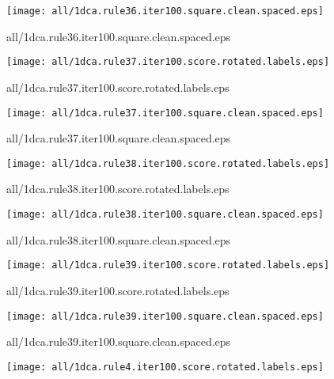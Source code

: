 \documentclass{article}
\begin{document}
\begin{center}
\begin{minipage}{\textwidth}
\texttt{[image: all/1dca.rule36.iter100.square.clean.spaced.eps]}
\end{minipage}
\end{center}
{\footnotesize all/1dca.rule36.iter100.square.clean.spaced.eps}
\begin{center}
\begin{minipage}{\textwidth}
\texttt{[image: all/1dca.rule37.iter100.score.rotated.labels.eps]}
\end{minipage}
\end{center}
{\footnotesize all/1dca.rule37.iter100.score.rotated.labels.eps}
\begin{center}
\begin{minipage}{\textwidth}
\texttt{[image: all/1dca.rule37.iter100.square.clean.spaced.eps]}
\end{minipage}
\end{center}
{\footnotesize all/1dca.rule37.iter100.square.clean.spaced.eps}
\begin{center}
\begin{minipage}{\textwidth}
\texttt{[image: all/1dca.rule38.iter100.score.rotated.labels.eps]}
\end{minipage}
\end{center}
{\footnotesize all/1dca.rule38.iter100.score.rotated.labels.eps}
\begin{center}
\begin{minipage}{\textwidth}
\texttt{[image: all/1dca.rule38.iter100.square.clean.spaced.eps]}
\end{minipage}
\end{center}
{\footnotesize all/1dca.rule38.iter100.square.clean.spaced.eps}
\begin{center}
\begin{minipage}{\textwidth}
\texttt{[image: all/1dca.rule39.iter100.score.rotated.labels.eps]}
\end{minipage}
\end{center}
{\footnotesize all/1dca.rule39.iter100.score.rotated.labels.eps}
\begin{center}
\begin{minipage}{\textwidth}
\texttt{[image: all/1dca.rule39.iter100.square.clean.spaced.eps]}
\end{minipage}
\end{center}
{\footnotesize all/1dca.rule39.iter100.square.clean.spaced.eps}
\begin{center}
\begin{minipage}{\textwidth}
\texttt{[image: all/1dca.rule4.iter100.score.rotated.labels.eps]}
\end{minipage}
\end{center}
\end{document}
